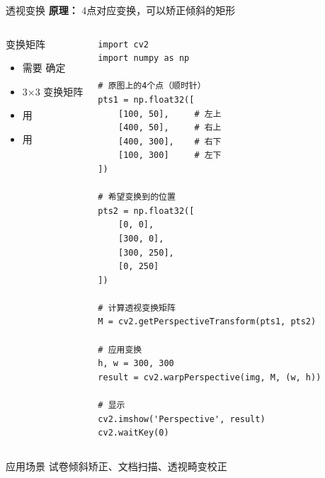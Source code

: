 \begin{frame}[fragile]{透视变换}
    \textbf{原理：} 4点对应变换，可以矫正倾斜的矩形

    \begin{columns}
        \begin{block}{变换矩阵}
            \begin{itemize}
                \item 需要 确定
                \item 3×3 变换矩阵
                \item 用 
                \item 用 
            \end{itemize}
        \end{block}

        \begin{lstlisting}[basicstyle=\ttfamily\scriptsize]
import cv2
import numpy as np

# 原图上的4个点（顺时针）
pts1 = np.float32([
    [100, 50],     # 左上
    [400, 50],     # 右上
    [400, 300],    # 右下
    [100, 300]     # 左下
])

# 希望变换到的位置
pts2 = np.float32([
    [0, 0],
    [300, 0],
    [300, 250],
    [0, 250]
])

# 计算透视变换矩阵
M = cv2.getPerspectiveTransform(pts1, pts2)

# 应用变换
h, w = 300, 300
result = cv2.warpPerspective(img, M, (w, h))

# 显示
cv2.imshow('Perspective', result)
cv2.waitKey(0)
        \end{lstlisting}
    \end{columns}

    \begin{alertblock}{应用场景}
        试卷倾斜矫正、文档扫描、透视畸变校正
    \end{alertblock}
\end{frame}

